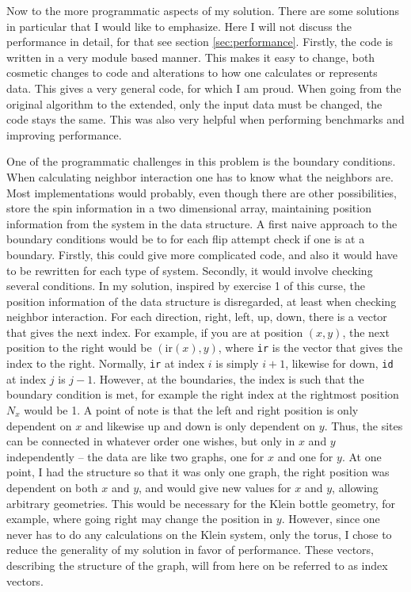 \documentclass[12pt, a4paper]{article}
\begin{document}
Now to the more programmatic aspects of my solution.
There are some solutions in particular that I would like to emphasize.
Here I will not discuss the performance in detail, for that see section \ref{sec:performance}.
Firstly, the code is written in a very module based manner.
This makes it easy to change, both cosmetic changes to code and alterations to how one calculates or represents data.
This gives a very general code, for which I am proud.
When going from the original algorithm to the extended, only the input data must be changed, the code stays the same.
This was also very helpful when performing benchmarks and improving performance.

One of the programmatic challenges in this problem is the boundary conditions.
When calculating neighbor interaction one has to know what the neighbors are.
Most implementations would probably, even though there are other possibilities, store the spin information in a two dimensional array, maintaining position information from the system in the data structure.
A first naive approach to the boundary conditions would be to for each flip attempt check if one is at a boundary.
Firstly, this could give more complicated code, and also it would have to be rewritten for each type of system.
Secondly, it would involve checking several conditions.
In my solution, inspired by exercise 1 of this curse, the position information of the data structure is disregarded, at least when checking neighbor interaction.
For each direction, right, left, up, down, there is a vector that gives the next index.
For example, if you are at position $(x, y)$, the next position to the right would be $(\text{ir}(x), y)$, where \verb|ir| is the vector that gives the index to the right.
Normally, \verb|ir| at index $i$ is simply $i+1$, likewise for down, \verb|id| at index $j$ is $j-1$.
However, at the boundaries, the index is such that the boundary condition is met, for example the right index at the rightmost position $N_x$ would be 1.
A point of note is that the left and right position is only dependent on $x$ and likewise up and down is only dependent on $y$.
Thus, the sites can be connected in whatever order one wishes, but only in $x$ and $y$ independently -- the data are like two graphs, one for $x$ and one for $y$.
At one point, I had the structure so that it was only one graph, the right position was dependent on both $x$ and $y$, and would give new values for $x$ and $y$, allowing arbitrary geometries.
This would be necessary for the Klein bottle geometry, for example, where going right may change the position in $y$.
However, since one never has to do any calculations on the Klein system, only the torus, I chose to reduce the generality of my solution in favor of performance.
These vectors, describing the structure of the graph, will from here on be referred to as index vectors.
\end{document}
